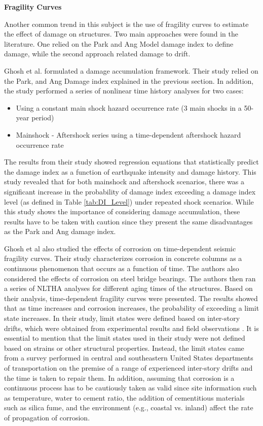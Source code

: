 \textbf{Fragility Curves}

Another common trend in this subject is the use of fragility curves to estimate the effect of damage on structures. Two main approaches were found in the literature. One relied on the Park and Ang Model damage index to define damage, while the second approach related damage to drift.

Ghosh et al. \cite{Ghosh2015} formulated a damage accumulation framework. Their study relied on the Park, and Ang Damage index explained in the previous section. In addition, the study performed a series of nonlinear time history analyses for two cases:

\begin{itemize}
	\item Using a constant main shock hazard occurrence rate (3 main shocks in a 50-year period)
	\item Mainshock - Aftershock series using a time-dependent aftershock hazard occurrence rate
\end{itemize}

The results from their study showed regression equations that statistically predict the damage index as a function of earthquake intensity and damage history. This study revealed that for both mainshock and aftershock scenarios, there was a significant increase in the probability of damage index exceeding a damage index level (as defined in Table \ref{tab:DI_Level}) under repeated shock scenarios. While this study shows the importance of considering damage accumulation, these results have to be taken with caution since they present the same disadvantages as the Park and Ang damage index.

Ghosh et al \cite{Ghosh2010} also studied the effects of corrosion on time-dependent seismic fragility curves. Their study characterizes corrosion in concrete columns as a continuous phenomenon that occurs as a function of time. The authors also considered the effects of corrosion on steel bridge bearings. The authors then ran a series of NLTHA analyses for different aging times of the structures. Based on their analysis, time-dependent fragility curves were presented. The results showed that as time increases and corrosion increases, the probability of exceeding a limit state increases. In their study, limit states were defined based on inter-story drifts, which were obtained from experimental results and field observations \cite{Padgett2007}. It is essential to mention that the limit states used in their study were not defined based on strains or other structural properties. Instead, the limit states came from a survey performed in central and southeastern United States departments of transportation on the premise of a range of experienced inter-story drifts and the time is taken to repair them. In addition, assuming that corrosion is a continuous process has to be cautiously taken as valid since site information such as temperature, water to cement ratio, the addition of cementitious materials such as silica fume, and the environment (e.g., coastal vs. inland) affect the rate of propagation of corrosion\cite{Thoft-Christensen}.

